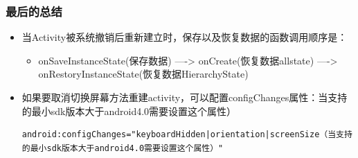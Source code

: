 \documentclass[9pt, b5paper]{article}
\begin{document}
\subsubsection{最后的总结}
\label{sec-1-1-5}
\begin{itemize}
\item 当Activity被系统撤销后重新建立时，保存以及恢复数据的函数调用顺序是：
\begin{itemize}
\item onSaveInstanceState(保存数据) ----> onCreate(恢复数据allstate) ----> onRestoryInstanceState(恢复数据HierarchyState)
\end{itemize}
\item 如果要取消切换屏幕方法重建activity，可以配置configChanges属性：当支持的最小sdk版本大于android4.0需要设置这个属性）
\begin{verbatim}
android:configChanges="keyboardHidden|orientation|screenSize（当支持的最小sdk版本大于android4.0需要设置这个属性）"
\end{verbatim}
\end{itemize}
\end{document}
